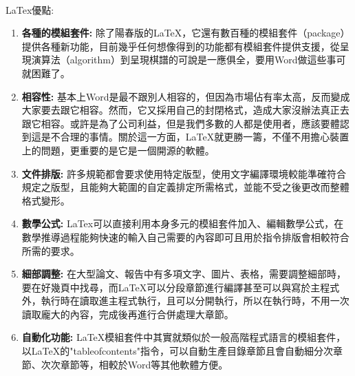 \par
\renewcommand{\baselinestretch}{1} %
\twelve \quad\\LaTex優點:
\par
\begin{enumerate}
	\item \textbf{各種的模組套件:} 除了陽春版的LaTeX，它還有數百種的模組套件（package）提供各種新功能，目前幾乎任何想像得到的功能都有模組套件提供支援，從呈現演算法（algorithm）到呈現棋譜的可說是一應俱全，要用Word做這些事可就困難了。
	\item \textbf{相容性:} 基本上Word是最不跟別人相容的，但因為市場佔有率太高，反而變成大家要去跟它相容。然而，它又採用自己的封閉格式，造成大家沒辦法真正去跟它相容。或許是為了公司利益，但是我們多數的人都是使用者，應該要體認到這是不合理的事情。關於這一方面，LaTeX就更勝一籌，不僅不用擔心裝置上的問題，更重要的是它是一個開源的軟體。
	\item \textbf{文件排版:} 許多規範都會要求使用特定版型，使用文字編譯環境較能準確符合規定之版型，且能夠大範圍的自定義排定所需格式，並能不受之後更改而整體格式變形。
	\item \textbf{數學公式:} LaTex可以直接利用本身多元的模組套件加入、編輯數學公式，在數學推導過程能夠快速的輸入自己需要的內容即可且用於指令排版會相較符合所需的要求。
	\item \textbf{細部調整:} 在大型論文、報告中有多項文字、圖片、表格，需要調整細部時，要在好幾頁中找尋，而LaTeX可以分段章節進行編譯甚至可以與寫於主程式外，執行時在讀取進主程式執行，且可以分開執行，所以在執行時，不用一次讀取龐大的內容，完成後再進行合併處理大章節。
	\item \textbf{自動化功能:} LaTeX模組套件中其實就類似於一般高階程式語言的模組套件，以LaTeX的"tableofcontents"指令，可以自動生產目錄章節且會自動細分次章節、次次章節等，相較於Word等其他軟體方便。
\end{enumerate}
\par